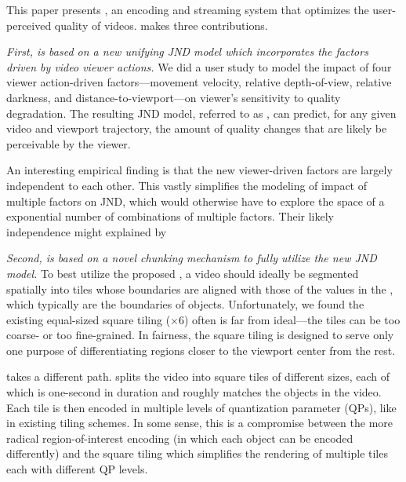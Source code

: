 This paper presents {\em \name}, an encoding and streaming system that optimizes the user-perceived quality of \vr videos. 
\name makes three contributions.

\vspace{0.2cm}
{\em First, \name is based on a new unifying JND model which incorporates the factors driven by \vr video viewer actions.}
We did a user study to model the impact of four viewer action-driven factors---movement velocity, relative depth-of-view, relative darkness, and distance-to-viewport---on viewer's sensitivity to quality degradation.
The resulting JND model, referred to as {\em \vrjnd}, can predict, for any given video and viewport trajectory, the amount of quality changes  that are likely be perceivable by the viewer.

An interesting empirical finding is that the new viewer-driven factors are largely independent to each other.
This vastly simplifies the modeling of impact of multiple factors on JND, which would otherwise have to explore the space of a exponential number of combinations of multiple factors.
Their likely independence might explained by 


\vspace{0.2cm}
{\em Second, \name is based on a novel chunking mechanism to fully utilize the new JND model.}
To best utilize the proposed \vrjnd,  a video should ideally be segmented spatially into tiles whose boundaries are aligned with those of the values in the \vrjnd, which typically are the boundaries of objects.
Unfortunately, we found the existing equal-sized square tiling ($\times$6) often is far from ideal---the tiles can be too coarse- or too fine-grained. 
In fairness, the square tiling is designed to serve only one purpose of differentiating regions closer to the viewport center from the rest.

\name takes a different path. 
\name splits the \vr video into square tiles of different sizes, each of which is one-second in duration and roughly matches the objects in the video. Each tile is then encoded in multiple levels of quantization parameter (QPs), like in existing tiling schemes.
In some sense, this is a compromise between the more radical region-of-interest encoding (in which each object can be encoded differently) and the square tiling which simplifies the rendering of multiple tiles each with different QP levels.



